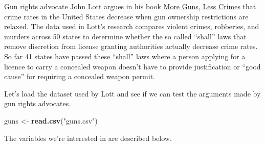 \documentclass[]{article}
\newenvironment{Shaded}{\begin{snugshade}}{\end{snugshade}}
\newcommand{\KeywordTok}[1]{\textcolor[rgb]{0.13,0.29,0.53}{\textbf{{#1}}}}
\newcommand{\StringTok}[1]{\textcolor[rgb]{0.31,0.60,0.02}{{#1}}}
\newcommand{\NormalTok}[1]{{#1}}
\theoremstyle{definition}
\theoremstyle{definition}
\theoremstyle{remark}
\begin{document}
Gun rights advocate John Lott argues in his book
\href{https://en.wikipedia.org/wiki/More_Guns,_Less_Crime}{More Guns,
Less Crimes} that crime rates in the United States decrease when gun
ownership restrictions are relaxed. The data used in Lott's research
compares violent crimes, robberies, and murders across 50 states to
determine whether the so called ``shall'' laws that remove discretion
from license granting authorities actually decrease crime rates. So far
41 states have passed these ``shall'' laws where a person applying for a
licence to carry a concealed weapon doesn't have to provide
justification or ``good cause'' for requiring a concealed weapon permit.

Let's load the dataset used by Lott and see if we can test the arguments
made by gun rights advocates.

\begin{Shaded}
\begin{Highlighting}[]
\NormalTok{guns <-}\StringTok{ }\KeywordTok{read.csv}\NormalTok{(}\StringTok{"guns.csv"}\NormalTok{)}
\end{Highlighting}
\end{Shaded}

The variables we're interested in are described below.
\end{document}
